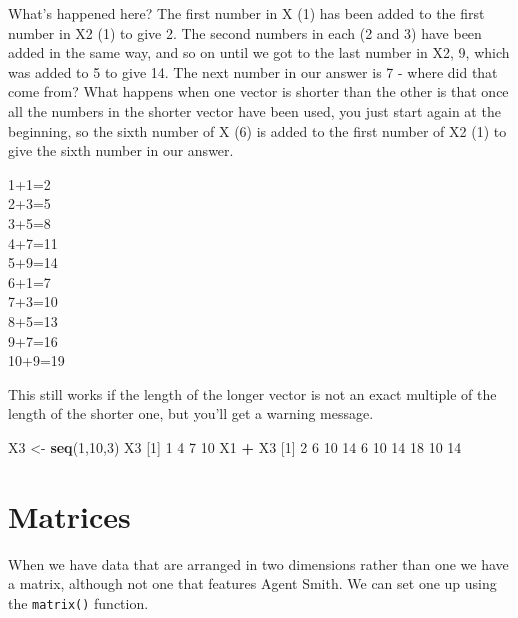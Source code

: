 \documentclass[
]{book}
\newenvironment{Shaded}{\begin{snugshade}}{\end{snugshade}}
\newcommand{\DecValTok}[1]{\textcolor[rgb]{0.00,0.00,0.81}{#1}}
\newcommand{\KeywordTok}[1]{\textcolor[rgb]{0.13,0.29,0.53}{\textbf{#1}}}
\newcommand{\NormalTok}[1]{#1}
\newcommand{\OperatorTok}[1]{\textcolor[rgb]{0.81,0.36,0.00}{\textbf{#1}}}
\newcommand{\StringTok}[1]{\textcolor[rgb]{0.31,0.60,0.02}{#1}}
\begin{document}
What's happened here? The first number in X (1) has been added to the first number in X2 (1) to give 2. The second numbers in each (2 and 3) have been added in the same way, and so on until we got to the last number in X2, 9, which was added to 5 to give 14. The next number in our answer is 7 - where did that come from? What happens when one vector is shorter than the other is that once all the numbers in the shorter vector have been used, you just start again at the beginning, so the sixth number of X (6) is added to the first number of X2 (1) to give the sixth number in our answer.

1+1=2\\
2+3=5\\
3+5=8\\
4+7=11\\
5+9=14\\
6+1=7\\
7+3=10\\
8+5=13\\
9+7=16\\
10+9=19

This still works if the length of the longer vector is not an exact multiple of the length of the shorter one, but you'll get a warning message.

\begin{Shaded}
\begin{Highlighting}[]
\NormalTok{X3 <-}\StringTok{ }\KeywordTok{seq}\NormalTok{(}\DecValTok{1}\NormalTok{,}\DecValTok{10}\NormalTok{,}\DecValTok{3}\NormalTok{)}
\NormalTok{X3}
\NormalTok{[}\DecValTok{1}\NormalTok{]  }\DecValTok{1}  \DecValTok{4}  \DecValTok{7} \DecValTok{10}
\NormalTok{X1 }\OperatorTok{+}\StringTok{ }\NormalTok{X3}
\NormalTok{ [}\DecValTok{1}\NormalTok{]  }\DecValTok{2}  \DecValTok{6} \DecValTok{10} \DecValTok{14}  \DecValTok{6} \DecValTok{10} \DecValTok{14} \DecValTok{18} \DecValTok{10} \DecValTok{14}
\end{Highlighting}
\end{Shaded}

\hypertarget{matrices}{%
\section{Matrices}\label{matrices}}

When we have data that are arranged in two dimensions rather than one we have a matrix, although not one that features Agent Smith. We can set one up using the \texttt{matrix()} function.
\end{document}
